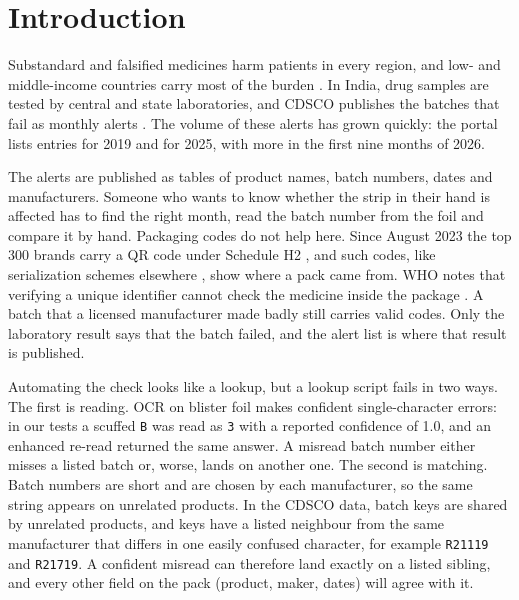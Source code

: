 \section{Introduction}
\label{sec:intro}

Substandard and falsified medicines harm patients in every region, and low- and middle-income countries carry most of the burden \cite{who2017oneinten,ozawa2018prevalence}. In India, drug samples are tested by central and state laboratories, and CDSCO publishes the batches that fail as monthly alerts \cite{cdsco2026portal}. The volume of these alerts has grown quickly: the portal lists \RowsYearFirst{} entries for 2019 and \RowsYearTwentyFive{} for 2025, with \RowsYearTwentySix{} more in the first nine months of 2026.

The alerts are published as tables of product names, batch numbers, dates and manufacturers. Someone who wants to know whether the strip in their hand is affected has to find the right month, read the batch number from the foil and compare it by hand. Packaging codes do not help here. Since August 2023 the top 300 brands carry a QR code under Schedule H2 \cite{cdsco2023faqqr}, and such codes, like serialization schemes elsewhere \cite{who2021traceability,fda2026dscsaexemptions}, show where a pack came from. WHO notes that verifying a unique identifier cannot check the medicine inside the package \cite{who2021traceability}. A batch that a licensed manufacturer made badly still carries valid codes. Only the laboratory result says that the batch failed, and the alert list is where that result is published.

Automating the check looks like a lookup, but a lookup script fails in two ways. The first is reading. OCR on blister foil makes confident single-character errors: in our tests a scuffed \texttt{B} was read as \texttt{3} with a reported confidence of 1.0, and an enhanced re-read returned the same answer. A misread batch number either misses a listed batch or, worse, lands on another one. The second is matching. Batch numbers are short and are chosen by each manufacturer, so the same string appears on unrelated products. In the CDSCO data, \CollisionKeys{} batch keys are shared by unrelated products, and \SiblingKeys{} keys have a listed neighbour from the same manufacturer that differs in one easily confused character, for example \texttt{R21119} and \texttt{R21719}. A confident misread can therefore land exactly on a listed sibling, and every other field on the pack (product, maker, dates) will agree with it.

